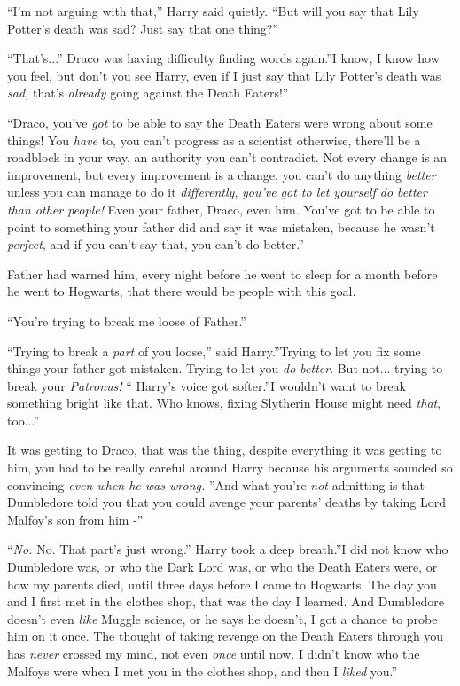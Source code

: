 ``I'm not arguing with that,'' Harry said quietly. ``But will you say
that Lily Potter's death was sad? Just say that one thing?''

``That's...'' Draco was having difficulty finding words again.''I
know, I know how you feel, but don't you see Harry, even if I just say
that Lily Potter's death was \emph{sad,} that's \emph{already} going
against the Death Eaters!''

``Draco, you've \emph{got} to be able to say the Death Eaters were wrong
about some things! You \emph{have} to, you can't progress as a scientist
otherwise, there'll be a roadblock in your way, an authority you can't
contradict. Not every change is an improvement, but every improvement is
a change, you can't do anything \emph{better} unless you can manage to
do it \emph{differently}, \emph{you've got to let yourself do better
than other people!} Even your father, Draco, even him. You've got to be
able to point to something your father did and say it was mistaken,
because he wasn't \emph{perfect}, and if you can't say that, you can't
do better.''

Father had warned him, every night before he went to sleep for a month
before he went to Hogwarts, that there would be people with this goal.

``You're trying to break me loose of Father.''

``Trying to break a \emph{part} of you loose,'' said Harry.''Trying to
let you fix some things your father got mistaken. Trying to let you
\emph{do better}. But not... trying to break your \emph{Patronus!}
`` Harry's voice got softer.''I wouldn't want to break something bright
like that. Who knows, fixing Slytherin House might need \emph{that},
too...''

It was getting to Draco, that was the thing, despite everything it was
getting to him, you had to be really careful around Harry because his
arguments sounded so convincing \emph{even when he was wrong.} ''And what
you're \emph{not} admitting is that Dumbledore told you that you could
avenge your parents' deaths by taking Lord Malfoy's son from him -''

``\emph{No.} No. That part's just wrong.'' Harry took a deep breath.''I
did not know who Dumbledore was, or who the Dark Lord was, or who the
Death Eaters were, or how my parents died, until three days before I
came to Hogwarts. The day you and I first met in the clothes shop, that
was the day I learned. And Dumbledore doesn't even \emph{like} Muggle
science, or he says he doesn't, I got a chance to probe him on it once.
The thought of taking revenge on the Death Eaters through you has
\emph{never} crossed my mind, not even \emph{once} until now. I didn't
know who the Malfoys were when I met you in the clothes shop, and then I
\emph{liked} you.''

